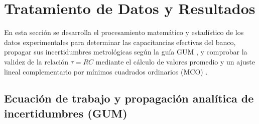 
\section{Tratamiento de Datos y Resultados}
\label{sec:tratamiento}

En esta sección se desarrolla el procesamiento matemático y estadístico de los datos experimentales para determinar las capacitancias efectivas del banco, propagar sus incertidumbres metrológicas según la guía GUM \cite{gum}, y comprobar la validez de la relación $\tau = RC$ mediante el cálculo de valores promedio y un ajuste lineal complementario por mínimos cuadrados ordinarios (MCO) \cite{taylor}.

\subsection{Ecuación de trabajo y propagación analítica de incertidumbres (GUM)}

